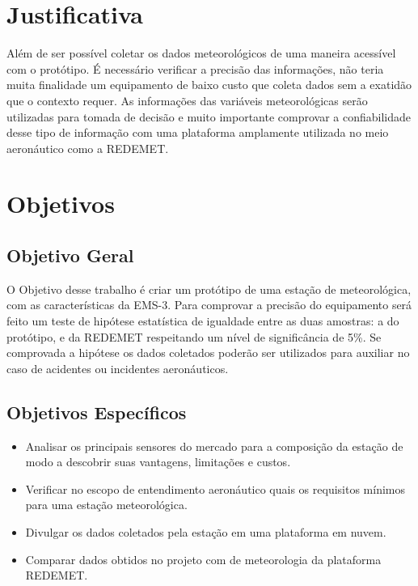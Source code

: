 \section{Justificativa}

Além de ser possível coletar os dados meteorológicos de uma maneira acessível com o protótipo. É necessário verificar a precisão das informações, não teria muita finalidade um equipamento de baixo custo que coleta dados sem a exatidão que o contexto requer. As informações das variáveis meteorológicas serão utilizadas para tomada de decisão e muito importante comprovar a confiabilidade desse tipo de informação com uma plataforma amplamente utilizada no meio aeronáutico como a REDEMET.

\section{Objetivos}

\subsection{Objetivo Geral}

O Objetivo desse trabalho é criar um protótipo de uma estação de meteorológica, com as características da EMS-3. Para comprovar a precisão do equipamento será feito um teste de hipótese estatística de igualdade entre as duas amostras: a do protótipo, e da REDEMET respeitando um nível de significância de 5\%. Se comprovada a hipótese os dados coletados poderão ser utilizados para auxiliar no caso de acidentes ou incidentes aeronáuticos.


\subsection{Objetivos Específicos}

\begin{itemize}
    \item Analisar os principais sensores do mercado para a composição da estação de modo a descobrir suas vantagens, limitações e custos.
    \item Verificar no escopo de entendimento aeronáutico quais os requisitos mínimos para uma estação meteorológica. 
    \item Divulgar os dados coletados pela estação em uma plataforma em nuvem.
    \item Comparar dados obtidos no projeto com de meteorologia da plataforma REDEMET.
\end{itemize}

